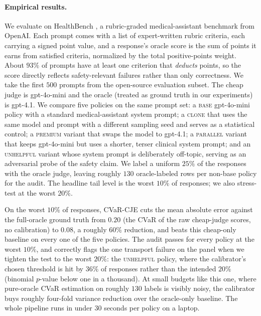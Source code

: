 \paragraph{Empirical results.}
We evaluate on HealthBench \citep{OpenAI2025HealthBench}, a
rubric-graded medical-assistant benchmark from OpenAI. Each prompt
comes with a list of expert-written rubric criteria, each carrying a
signed point value, and a response's oracle score is the sum of
points it earns from satisfied criteria, normalized by the total
positive-points weight. About $93\%$ of prompts have at least one
criterion that \emph{deducts} points, so the score directly reflects
safety-relevant failures rather than only correctness. We take the
first $500$ prompts from the open-source evaluation subset. The cheap
judge is gpt-4o-mini and the oracle (treated as ground truth in our
experiments) is gpt-4.1. We compare five policies on the same prompt
set: a \textsc{base} gpt-4o-mini policy with a standard
medical-assistant system prompt; a \textsc{clone} that uses the same
model and prompt with a different sampling seed and serves as a
statistical control; a \textsc{premium} variant that swaps the model
to gpt-4.1; a \textsc{parallel} variant that keeps gpt-4o-mini but
uses a shorter, terser clinical system prompt; and an
\textsc{unhelpful} variant whose system prompt is deliberately
off-topic, serving as an adversarial probe of the safety claim. We
label a uniform $25\%$ of the responses with the oracle judge,
leaving roughly $130$ oracle-labeled rows per non-base policy for
the audit. The headline tail level is the worst $10\%$ of responses;
we also stress-test at the worst $20\%$.

On the worst $10\%$ of responses, CVaR-CJE cuts the mean absolute
error against the full-oracle ground truth from $0.20$ (the CVaR of
the raw cheap-judge scores, no calibration) to $0.08$, a roughly
$60\%$ reduction, and beats this cheap-only baseline on every one of
the five policies. The audit passes for every policy at the worst
$10\%$, and correctly flags the one transport failure on the panel
when we tighten the test to the worst $20\%$: the \textsc{unhelpful}
policy, where the calibrator's chosen threshold is hit by $36\%$ of
responses rather than the intended $20\%$ (binomial $p$-value below
one in a thousand). At small budgets like this one, where pure-oracle
CVaR estimation on roughly $130$ labels is visibly noisy, the
calibrator buys roughly four-fold variance reduction over the
oracle-only baseline. The whole pipeline runs in under $30$ seconds
per policy on a laptop.
